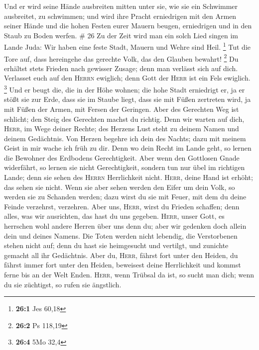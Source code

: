  Und er wird seine Hände ausbreiten mitten unter sie, wie
sie ein Schwimmer ausbreitet, zu schwimmen; und wird ihre Pracht
erniedrigen mit den Armen seiner Hände  und die hohen
Festen eurer Mauern beugen, erniedrigen und in den Staub zu Boden
werfen. \# 26  Zu der Zeit wird man ein solch Lied singen
im Lande Juda: Wir haben eine feste Stadt, Mauern und Wehre sind Heil.
\footnote{\textbf{26:1} Jes 60,18}  Tut die Tore auf, dass
hereingehe das gerechte Volk, das den Glauben bewahrt! \footnote{\textbf{26:2}
  Ps 118,19}  Du erhältst stets Frieden nach gewisser
Zusage; denn man verlässt sich auf dich.  Verlasset euch
auf den \textsc{Herrn} ewiglich; denn Gott der \textsc{Herr} ist ein
Fels ewiglich. \footnote{\textbf{26:4} 5Mo 32,4}  Und er
beugt die, die in der Höhe wohnen; die hohe Stadt erniedrigt er, ja er
stößt sie zur Erde, dass sie im Staube liegt,  dass sie
mit Füßen zertreten wird, ja mit Füßen der Armen, mit Fersen der
Geringen.  Aber des Gerechten Weg ist schlicht; den Steig
des Gerechten machst du richtig.  Denn wir warten auf
dich, \textsc{Herr}, im Wege deiner Rechte; des Herzens Lust steht zu
deinem Namen und deinem Gedächtnis.  Von Herzen begehre
ich dein des Nachts; dazu mit meinem Geist in mir wache ich früh zu dir.
Denn wo dein Recht im Lande geht, so lernen die Bewohner des Erdbodens
Gerechtigkeit.  Aber wenn den Gottlosen Gnade widerfährt,
so lernen sie nicht Gerechtigkeit, sondern tun nur übel im richtigen
Lande; denn sie sehen des \textsc{Herrn} Herrlichkeit nicht.
 \textsc{Herr}, deine Hand ist erhöht; das sehen sie
nicht. Wenn sie aber sehen werden den Eifer um dein Volk, so werden sie
zu Schanden werden; dazu wirst du sie mit Feuer, mit dem du deine Feinde
verzehrst, verzehren.  Aber uns, \textsc{Herr}, wirst du
Frieden schaffen; denn alles, was wir ausrichten, das hast du uns
gegeben.  \textsc{Herr}, unser Gott, es herrschen wohl
andere Herren über uns denn du; aber wir gedenken doch allein dein und
deines Namens.  Die Toten werden nicht lebendig, die
Verstorbenen stehen nicht auf; denn du hast sie heimgesucht und
vertilgt, und zunichte gemacht all ihr Gedächtnis.  Aber
du, \textsc{Herr}, fährst fort unter den Heiden, du fährst immer fort
unter den Heiden, beweisest deine Herrlichkeit und kommst ferne bis an
der Welt Enden.  \textsc{Herr}, wenn Trübsal da ist, so
sucht man dich; wenn du sie züchtigst, so rufen sie ängstlich.
